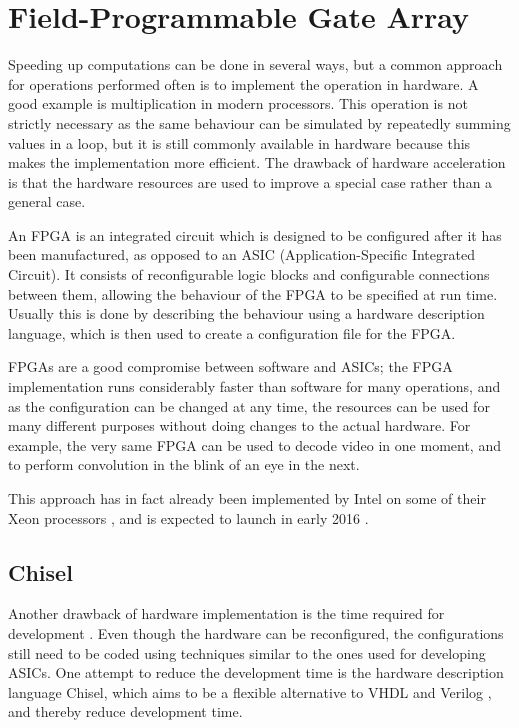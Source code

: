 \section{Field-Programmable Gate Array}
Speeding up computations can be done in several ways, but a common approach for operations performed often is to implement the operation in hardware.
A good example is multiplication in modern processors.
This operation is not strictly necessary as the same behaviour can be simulated by repeatedly summing values in a loop, but it is still commonly available in hardware because this makes the implementation more efficient.
The drawback of hardware acceleration is that the hardware resources are used to improve a special case rather than a general case.

An FPGA is an integrated circuit which is designed to be configured after it has been manufactured, as opposed to an ASIC (Application-Specific Integrated Circuit).
It consists of reconfigurable logic blocks and configurable connections between them, allowing the behaviour of the FPGA to be specified at run time. Usually this is done by describing the behaviour using a hardware description language, which is then used to create a configuration file for the FPGA.

FPGAs are a good compromise between software and ASICs; the FPGA implementation runs considerably faster than software for many operations, and as the configuration can be changed at any time, the resources can be used for many different purposes without doing changes to the actual hardware.
For example, the very same FPGA can be used to decode video in one moment, and to perform convolution in the blink of an eye in the next.

This approach has in fact already been implemented by Intel on some of their Xeon processors \cite{intelxeonfpga}, and is expected to launch in early 2016 \cite{PCWorldIntelFPGA}.

\subsection{Chisel}
\label{sec:chisel}
Another drawback of hardware implementation is the time required for development \cite{fpgaprosandcons}. 
Even though the hardware can be reconfigured, the configurations still need to be coded using techniques similar to the ones used for developing ASICs.
One attempt to reduce the development time is the hardware description language Chisel, which aims to be a flexible alternative to VHDL and Verilog \cite{chiselpaper}, and thereby reduce development time.
